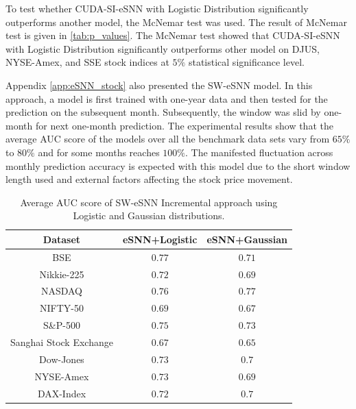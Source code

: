 
To test whether CUDA-SI-eSNN with Logistic Distribution significantly outperforms another model,  the McNemar test was used. The result of McNemar test is given in \tablename \ref{tab:p_values}. The McNemar test showed that CUDA-SI-eSNN with Logistic Distribution significantly outperforms other model on DJUS, NYSE-Amex, and SSE stock indices at $5\%$ statistical significance level.

Appendix \ref{app:eSNN_stock} also presented the SW-eSNN model. In this approach, a model is first trained with one-year data and then tested for the prediction on the subsequent month. Subsequently, the window was slid by one-month for next one-month prediction. The experimental results show that the average AUC score of the models over all the benchmark data sets vary from $65\%$ to $80\%$ and for some months reaches $100\%$. The manifested fluctuation across monthly prediction accuracy is expected with this model due to the short window length used and external factors affecting the stock price movement.

\begin{table}
	\centering
	\caption{Average AUC score of SW-eSNN Incremental approach using Logistic and Gaussian distributions.}
	\label{tab:avg_auc_score}
	\begin{tabular}{@{}ccc@{}}
		\toprule
		Dataset & eSNN+Logistic & eSNN+Gaussian \\ \midrule
		BSE                    & $\mathbf{0.77}$                            & $0.71$                            \\
		Nikkie-225             & $\mathbf{0.72}$                            & $0.69$                            \\
		NASDAQ                 & $0.76$ 
		    & $\mathbf{0.77}$                            \\
		NIFTY-50               & $\mathbf{0.69}$                            & $0.67$                            \\
		S\&P-500               & $\mathbf{0.75}$                            & $0.73$                            \\
		Sanghai Stock Exchange & $\mathbf{0.67}$                            & $0.65$                            \\
		Dow-Jones              & $\mathbf{0.73}$                            & $0.7$                             \\
		NYSE-Amex              & $\mathbf{0.73}$                            & $0.69$                            \\
		DAX-Index              & $\mathbf{0.72}$                            & $0.7$                             \\ \bottomrule
	\end{tabular}
\end{table}


